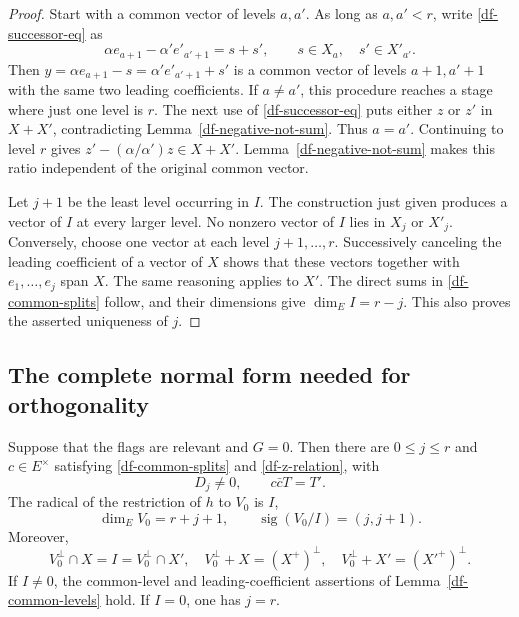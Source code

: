\begin{proof}
Start with a common vector of levels $a,a'$.  As long as $a,a'<r$,
write \eqref{df-successor-eq} as
\[
 \alpha e_{a+1}-\alpha'e'_{a'+1}=s+s',
 \qquad s\in X_a,\quad s'\in X'_{a'}.
\]
Then $y=\alpha e_{a+1}-s=\alpha'e'_{a'+1}+s'$ is a common
vector of levels $a+1,a'+1$ with the same two leading coefficients.
If $a\ne a'$, this procedure reaches a stage where just one level
is $r$.  The next use of \eqref{df-successor-eq} puts either $z$ or
$z'$ in $X+X'$, contradicting Lemma~\ref{df-negative-not-sum}.
Thus $a=a'$.  Continuing to level $r$ gives
$z'-(\alpha/\alpha')z\in X+X'$.  Lemma~\ref{df-negative-not-sum}
makes this ratio independent of the original common vector.

Let $j+1$ be the least level occurring in $I$.  The construction
just given produces a vector of $I$ at every larger level.  No
nonzero vector of $I$ lies in $X_j$ or $X'_j$.  Conversely, choose
one vector at each level $j+1,\ldots,r$.  Successively canceling
the leading coefficient of a vector of $X$ shows that these vectors
together with $e_1,\ldots,e_j$ span $X$.  The same reasoning applies
to $X'$.  The direct sums in \eqref{df-common-splits} follow, and
their dimensions give $\dim_E I=r-j$.  This also proves the
asserted uniqueness of $j$.
\end{proof}

\subsection{The complete normal form needed for orthogonality}

\begin{theorem}\label{df-normal-form}
Suppose that the flags are relevant and $G=0$.  Then there are
$0\leq j\leq r$ and $c\in E^\times$ satisfying
\eqref{df-common-splits} and \eqref{df-z-relation}, with
\begin{equation}\label{df-normal-form-values}
 D_j\ne0,\qquad c\bar c T=T'.
\end{equation}
The radical of the restriction of $h$ to $V_0$ is $I$,
\[
 \dim_E V_0=r+j+1,
 \qquad
 \operatorname{sig}(V_0/I)=(j,j+1).
\]
Moreover,
\begin{equation}\label{df-common-perp}
 V_0^\perp\cap X=I=V_0^\perp\cap X',\quad
 V_0^\perp+X=(X^+)^\perp,\quad
 V_0^\perp+X'=(X'^+)^\perp.
\end{equation}
If $I\ne0$, the common-level and leading-coefficient assertions of
Lemma~\ref{df-common-levels} hold.  If $I=0$, one has $j=r$.
\end{theorem}

